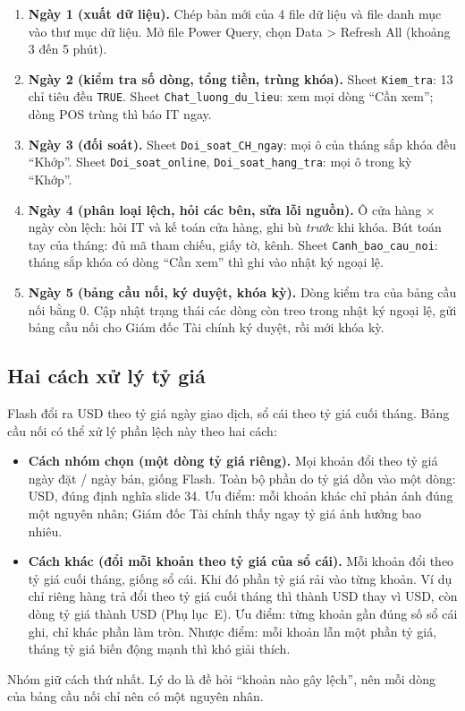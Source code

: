 \begin{notebox}
\begin{enumerate}
  \item \textbf{Ngày 1 (xuất dữ liệu).} Chép bản mới của 4 file dữ liệu và file danh mục vào thư mục dữ liệu. Mở file Power Query, chọn Data > Refresh All (khoảng 3 đến 5 phút).
  \item \textbf{Ngày 2 (kiểm tra số dòng, tổng tiền, trùng khóa).} Sheet \texttt{Kiem\_tra}: 13 chỉ tiêu đều \texttt{TRUE}. Sheet \texttt{Chat\_luong\_du\_lieu}: xem mọi dòng ``Cần xem''; dòng POS trùng thì báo IT ngay.
  \item \textbf{Ngày 3 (đối soát).} Sheet \texttt{Doi\_soat\_CH\_ngay}: mọi ô của tháng sắp khóa đều ``Khớp''. Sheet \texttt{Doi\_soat\_online}, \texttt{Doi\_soat\_hang\_tra}: mọi ô trong kỳ ``Khớp''.
  \item \textbf{Ngày 4 (phân loại lệch, hỏi các bên, sửa lỗi nguồn).} Ô cửa hàng $\times$ ngày còn lệch: hỏi IT và kế toán cửa hàng, ghi bù \emph{trước} khi khóa. Bút toán tay của tháng: đủ mã tham chiếu, giấy tờ, kênh. Sheet \texttt{Canh\_bao\_cau\_noi}: tháng sắp khóa có dòng ``Cần xem'' thì ghi vào nhật ký ngoại lệ.
  \item \textbf{Ngày 5 (bảng cầu nối, ký duyệt, khóa kỳ).} Dòng kiểm tra của bảng cầu nối bằng 0. Cập nhật trạng thái các dòng còn treo trong nhật ký ngoại lệ, gửi bảng cầu nối cho Giám đốc Tài chính ký duyệt, rồi mới khóa kỳ.
\end{enumerate}
\end{notebox}

\subsection{Hai cách xử lý tỷ giá}

Flash đổi ra USD theo tỷ giá ngày giao dịch, sổ cái theo tỷ giá cuối tháng. Bảng cầu nối có thể xử lý phần lệch này theo hai cách:
\begin{itemize}
  \item \textbf{Cách nhóm chọn (một dòng tỷ giá riêng).} Mọi khoản đổi theo tỷ giá ngày đặt / ngày bán, giống Flash. Toàn bộ phần do tỷ giá dồn vào một dòng: \SoTyGia{} USD, đúng định nghĩa slide 34. Ưu điểm: mỗi khoản khác chỉ phản ánh đúng một nguyên nhân; Giám đốc Tài chính thấy ngay tỷ giá ảnh hưởng bao nhiêu.
  \item \textbf{Cách khác (đổi mỗi khoản theo tỷ giá của sổ cái).} Mỗi khoản đổi theo tỷ giá cuối tháng, giống sổ cái. Khi đó phần tỷ giá rải vào từng khoản. Ví dụ chỉ riêng hàng trả đổi theo tỷ giá cuối tháng thì thành \SoDoiTraMoi{} USD thay vì \SoTienTra{} USD, còn dòng tỷ giá thành \SoDoiTyGiaMoi{} USD (Phụ lục~E). Ưu điểm: từng khoản gần đúng số sổ cái ghi, chỉ khác phần làm tròn. Nhược điểm: mỗi khoản lẫn một phần tỷ giá, tháng tỷ giá biến động mạnh thì khó giải thích.
\end{itemize}
Nhóm giữ cách thứ nhất. Lý do là đề hỏi ``khoản nào gây lệch'', nên mỗi dòng của bảng cầu nối chỉ nên có một nguyên nhân.
